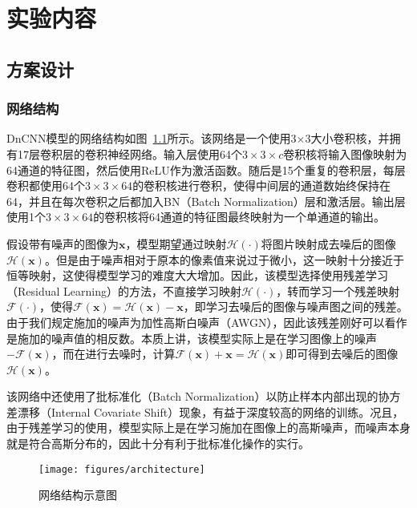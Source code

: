 
\chapter{实验内容}

\section{方案设计}

\subsection{网络结构}
DnCNN模型的网络结构如图~\ref{fig:architecture}所示。该网络是一个使用3$\times$3大小卷积核，并拥有17层卷积层的卷积神经网络。输入层使用64个$3 \times 3 \times c$卷积核将输入图像映射为64通道的特征图，然后使用ReLU作为激活函数。随后是15个重复的卷积层，每层卷积都使用64个$ 3 \times 3 \times 64 $的卷积核进行卷积，使得中间层的通道数始终保持在64，并且在每次卷积之后都加入BN（Batch Normalization）层和激活层。输出层使用1个$ 3 \times 3 \times 64 $的卷积核将64通道的特征图最终映射为一个单通道的输出。

假设带有噪声的图像为$ \boldsymbol{x} $，模型期望通过映射$ \mathcal{H}(\cdot) $将图片映射成去噪后的图像$ \mathcal{H}(\boldsymbol{x}) $。但是由于噪声相对于原本的像素值来说过于微小，这一映射十分接近于恒等映射，这使得模型学习的难度大大增加。因此，该模型选择使用残差学习（Residual Learning）的方法，不直接学习映射$ \mathcal{H}(\cdot) $，转而学习一个残差映射$ \mathcal{F}(\cdot) $，使得$ \mathcal{F}(\boldsymbol{x}) = \mathcal{H}(\boldsymbol{x}) - \boldsymbol{x} $，即学习去噪后的图像与噪声图之间的残差。由于我们规定施加的噪声为加性高斯白噪声（AWGN），因此该残差刚好可以看作是施加的噪声值的相反数。本质上讲，该模型实际上是在学习图像上的噪声$ -\mathcal{F}(\boldsymbol{x}) $，而在进行去噪时，计算$ \mathcal{F}(\boldsymbol{x}) + \boldsymbol{x} = \mathcal{H}(\boldsymbol{x}) $即可得到去噪后的图像$ \mathcal{H}(\boldsymbol{x}) $。

该网络中还使用了批标准化（Batch Normalization）以防止样本内部出现的协方差漂移（Internal Covariate Shift）现象，有益于深度较高的网络的训练。况且，由于残差学习的使用，模型实际上是在学习施加在图像上的高斯噪声，而噪声本身就是符合高斯分布的，因此十分有利于批标准化操作的实行。
\begin{figure}
	\centering
	\texttt{[image: figures/architecture]}
	\caption{网络结构示意图}
	\label{fig:architecture}
\end{figure}

